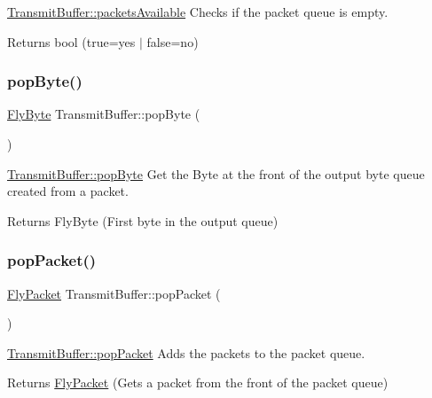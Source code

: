 \hyperlink{class_transmit_buffer_aad9976b2ae40b1405a319de979b09827}{Transmit\+Buffer\+::packets\+Available} Checks if the packet queue is empty. 

\begin{DoxyReturn}{Returns}
bool (true=yes $\vert$ false=no) 
\end{DoxyReturn}
\hypertarget{class_transmit_buffer_a6da9417079dd783d996af8fcc138149c}{}\label{class_transmit_buffer_a6da9417079dd783d996af8fcc138149c} 
\subsubsection{\texorpdfstring{pop\+Byte()}{popByte()}}
{\footnotesize\ttfamily \hyperlink{conversions_8h_a1f006e31a957accfe6aa1bf6f401efce}{Fly\+Byte} Transmit\+Buffer\+::pop\+Byte (\begin{DoxyParamCaption}{ }\end{DoxyParamCaption})}



\hyperlink{class_transmit_buffer_a6da9417079dd783d996af8fcc138149c}{Transmit\+Buffer\+::pop\+Byte} Get the Byte at the front of the output byte queue created from a packet. 

\begin{DoxyReturn}{Returns}
Fly\+Byte (First byte in the output queue) 
\end{DoxyReturn}
\hypertarget{class_transmit_buffer_add84c61a7f2f060d236feab584babc64}{}\label{class_transmit_buffer_add84c61a7f2f060d236feab584babc64} 
\subsubsection{\texorpdfstring{pop\+Packet()}{popPacket()}}
{\footnotesize\ttfamily \hyperlink{class_fly_packet}{Fly\+Packet} Transmit\+Buffer\+::pop\+Packet (\begin{DoxyParamCaption}{ }\end{DoxyParamCaption})}



\hyperlink{class_transmit_buffer_add84c61a7f2f060d236feab584babc64}{Transmit\+Buffer\+::pop\+Packet} Adds the packets to the packet queue. 

\begin{DoxyReturn}{Returns}
\hyperlink{class_fly_packet}{Fly\+Packet} (Gets a packet from the front of the packet queue) 
\end{DoxyReturn}
\hypertarget{class_transmit_buffer_aa7966064a6abaeb5ff3f7c8ff0402ec3}{}\label{class_transmit_buffer_aa7966064a6abaeb5ff3f7c8ff0402ec3} 
